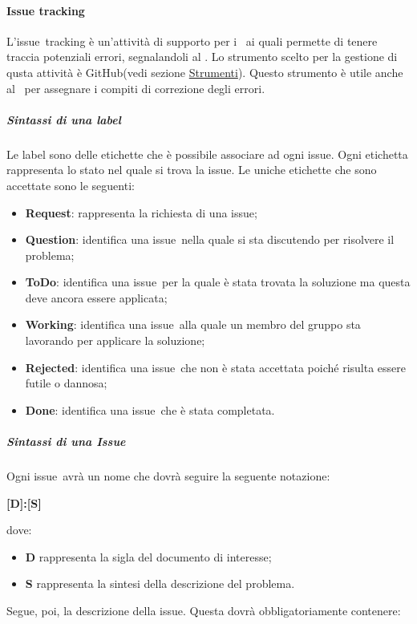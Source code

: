 \documentclass[../NormeProgetto.tex]{subfiles}
\begin{document}
		\paragraph{Issue tracking}
		L'issue\g\ tracking è un'attività di supporto per i \verificatori\ ai quali permette di tenere traccia potenziali errori, segnalandoli al \responsabilediprogetto. Lo strumento scelto per la gestione di qusta attività è GitHub(vedi sezione \hyperref[par:IssueTrk GitHub]{Strumenti}). Questo strumento è utile anche al \responsabilediprogetto\ per assegnare i compiti di correzione degli errori. 
			\subparagraph{Sintassi di una label}
		Le label sono delle etichette che è possibile associare ad ogni issue\g. Ogni etichetta rappresenta lo stato nel quale si trova la issue. Le uniche etichette che sono accettate sono le seguenti:
			\begin{itemize}
				\item \textbf{Request}: rappresenta la richiesta di una issue\g;
				\item \textbf{Question}: identifica una issue\g\ nella quale si sta discutendo per risolvere il problema;
				\item \textbf{ToDo}: identifica una issue\g\ per la quale è stata trovata la soluzione ma questa deve ancora essere applicata;
				\item \textbf{Working}: identifica una issue\g\ alla quale un membro del gruppo sta lavorando per applicare la soluzione;
				\item \textbf{Rejected}: identifica una issue\g\ che non è stata accettata poiché risulta essere futile o dannosa;
				\item \textbf{Done}: identifica una issue\g\ che è stata completata.
			\end{itemize}				
			\subparagraph{Sintassi di una Issue}
		Ogni issue\g\ avrà un nome che dovrà seguire la seguente notazione: \begin{center}\textbf{[D]:[S]}\end{center} dove:
			\begin{itemize} 
				\item \textbf{D} rappresenta la sigla del documento di interesse;
				\item \textbf{S} rappresenta la sintesi della descrizione del problema.
			\end{itemize}
			Segue, poi, la descrizione della issue\g. Questa dovrà obbligatoriamente contenere:
\end{document}
